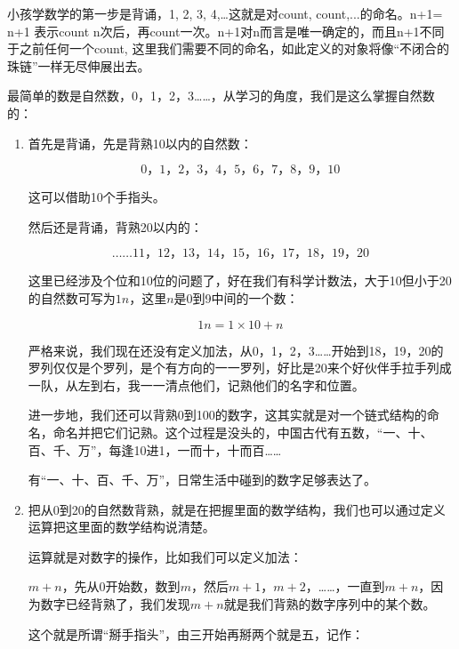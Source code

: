 小孩学数学的第一步是背诵，1, 2, 3, 4,…这就是对count, count,...的命名。n+1= n+1 表示count n次后，再count一次。n+1对n而言是唯一确定的，而且n+1不同于之前任何一个count, 这里我们需要不同的命名，如此定义的对象将像“不闭合的珠链”一样无尽伸展出去。

最简单的数是自然数，0，1，2，3……，从学习的角度，我们是这么掌握自然数的：

\begin{enumerate}
\item 

首先是背诵，先是背熟10以内的自然数：

\begin{equation}
\text{0，1，2，3，4，5，6，7，8，9，10}~
\end{equation}

这可以借助10个手指头。

然后还是背诵，背熟20以内的：

\begin{equation}
\text{……11，12，13，14，15，16，17，18，19，20}~
\end{equation}

这里已经涉及个位和10位的问题了，好在我们有科学计数法，大于10但小于20的自然数可写为$1n$，这里$n$是0到9中间的一个数：

\begin{equation}
1n  = 1 \times 10 + n~
\end{equation}

严格来说，我们现在还没有定义加法，从0，1，2，3……开始到18，19，20的罗列仅仅是个罗列，是个有方向的一一罗列，好比是20来个好伙伴手拉手列成一队，从左到右，我一一清点他们，记熟他们的名字和位置。

进一步地，我们还可以背熟0到100的数字，这其实就是对一个链式结构的命名，命名并把它们记熟。这个过程是没头的，中国古代有五数，“一、十、百、千、万”，每逢10进1，一而十，十而百……

有“一、十、百、千、万”，日常生活中碰到的数字足够表达了。

\item

把从0到20的自然数背熟，就是在把握里面的数学结构，我们也可以通过定义运算把这里面的数学结构说清楚。

运算就是对数字的操作，比如我们可以定义加法：

$m + n$，先从0开始数，数到$m$，然后$m+1$，$m+2$，……，一直到$m+n$，因为数字已经背熟了，我们发现$m+n$就是我们背熟的数字序列中的某个数。

这个就是所谓“掰手指头”，由三开始再掰两个就是五，记作：


\end{enumerate}
